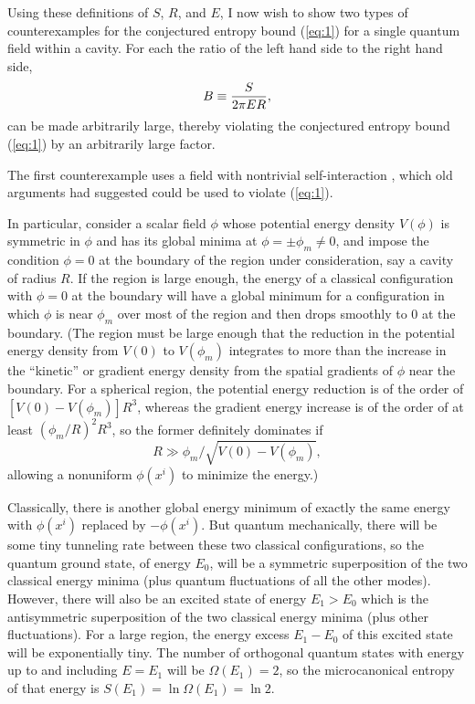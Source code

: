 \documentclass[a4paper,12pt]{article}
\begin{document}
	Using these definitions of $S$, $R$, and $E$,
I now wish to show two types of counterexamples
for the conjectured entropy bound (\ref{eq:1})
for a single quantum field within a cavity.
For each the ratio of the left hand side
to the right hand side,
 \begin{equation}
 B \equiv {S \over 2 \pi E R},
 \label{eq:2}
 \end{equation}
can be made arbitrarily large,
thereby violating the conjectured entropy bound (\ref{eq:1})
by an arbitrarily large factor.

	The first counterexample uses a field with nontrivial
self-interaction
\cite{Page2},
which old arguments
\cite{Page1}
had suggested could be used to violate (\ref{eq:1}).

	In particular, consider a scalar field
$\phi$ whose potential energy density $V(\phi)$
is symmetric in $\phi$ and has its global
minima at $\phi = \pm \phi_m \neq 0$,
and impose the condition $\phi = 0$ at the boundary
of the region under consideration,
say a cavity of radius $R$.
If the region is large enough,
the energy of a classical configuration
with $\phi = 0$ at the boundary will have
a global minimum for a configuration
in which $\phi$ is near $\phi_m$ over most
of the region and then drops smoothly to 0
at the boundary.
(The region must be large enough that
the reduction in the potential energy density
from $V(0)$ to $V(\phi_m)$ integrates to more
than the increase in the ``kinetic''
or gradient energy density from the spatial
gradients of $\phi$ near the boundary.
For a spherical region, the potential energy
reduction is of the order of $[V(0)-V(\phi_m)]R^3$,
whereas the gradient energy increase is of the order
of at least $(\phi_m/R)^2 R^3$,
so the former definitely dominates if
 \begin{equation}
 R \gg \phi_m/\sqrt{V(0)-V(\phi_m)},
 \label{eq:4}
 \end{equation}
allowing a nonuniform $\phi(x^i)$ to minimize the energy.)

	Classically, there is another global
energy minimum of exactly the same energy
with $\phi(x^i)$ replaced by $-\phi(x^i)$.
But quantum mechanically, there will be some
tiny tunneling rate between these two classical
configurations, so the quantum ground state,
of energy $E_0$,
will be a symmetric superposition of the two
classical energy minima (plus quantum fluctuations
of all the other modes).
However, there will also be an excited state
of energy $E_1 > E_0$ which is the antisymmetric
superposition of the two classical energy minima
(plus other fluctuations).
For a large region, the energy excess $E_1-E_0$
of this excited state will be exponentially tiny.
The number of orthogonal quantum states
with energy up to and including $E=E_1$ will be
$\Omega(E_1)=2$, so the microcanonical entropy
of that energy is $S(E_1)=\ln\Omega(E_1)=\ln 2$.
\end{document}
